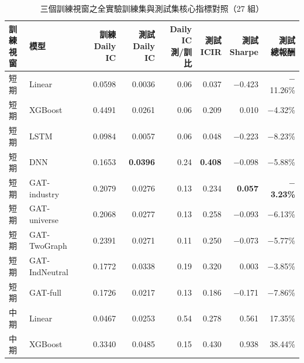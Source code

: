 \begin{table}[H]
\centering
\caption{三個訓練視窗之全實驗訓練集與測試集核心指標對照（27 組）}
\label{tab:results_overview_master}
\begingroup
\footnotesize
\setlength{\tabcolsep}{4pt}
\renewcommand{\arraystretch}{1.10}
\begin{adjustbox}{max width=\textwidth}
\begin{tabular}{@{}llrrrrrr@{}}
\toprule
\makecell[l]{訓練\\視窗} & 模型 & \makecell[r]{訓練\\Daily IC} & \makecell[r]{測試\\Daily IC} & \makecell[r]{Daily IC\\測/訓比} & \makecell[r]{測試\\ICIR} & \makecell[r]{測試\\Sharpe} & \makecell[r]{測試\\總報酬} \\
\midrule
短期 & Linear          & 0.0598 & 0.0036 &         0.06 &         0.037 &        $-$0.423 &  $-$11.26\% \\
短期 & XGBoost         & 0.4491 & 0.0261 &         0.06 &         0.209 &           0.010 &   $-$4.32\% \\
短期 & LSTM            & 0.0984 & 0.0057 &         0.06 &         0.048 &        $-$0.223 &   $-$8.23\% \\
短期 & DNN             & 0.1653 & \textbf{0.0396} & 0.24 & \textbf{0.408} &      $-$0.098 &   $-$5.88\% \\
短期 & GAT-industry    & 0.2079 & 0.0276 &         0.13 &         0.234 & \textbf{0.057}  & \textbf{$-$3.23\%} \\
短期 & GAT-universe    & 0.2068 & 0.0277 &         0.13 &         0.258 &        $-$0.093 &   $-$6.13\% \\
短期 & GAT-TwoGraph    & 0.2391 & 0.0271 &         0.11 &         0.250 &        $-$0.073 &   $-$5.77\% \\
短期 & GAT-IndNeutral  & 0.1772 & 0.0338 &         0.19 &         0.320 &           0.003 &   $-$3.85\% \\
短期 & GAT-full        & 0.1726 & 0.0217 &         0.13 &         0.186 &        $-$0.171 &   $-$7.86\% \\
\midrule
中期 & Linear         & 0.0467 & 0.0253 &         0.54 &         0.278 &          0.561  &   17.35\% \\
中期 & XGBoost        & 0.3340 & 0.0485 &         0.15 &         0.430 &          0.938  &   38.44\% \\

\end{tabular}
\end{adjustbox}
\end{table}
